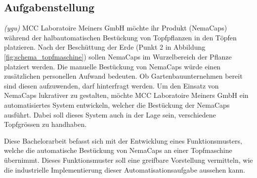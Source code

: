 \subsection{Aufgabenstellung}
\textit{(ygu)} MCC Laboratoire Meiners GmbH möchte ihr Produkt (NemaCaps) während der halbautomatischen Bestückung von Topfpflanzen in den Töpfen platzieren. Nach der Beschüttung der Erde (Punkt 2 in Abbildung \ref{fig:schema_topfmaschine}) sollen NemaCaps im Wurzelbereich der Pflanze platziert werden. Die manuelle Bestückung von NemaCaps würde einen zusätzlichen personellen Aufwand bedeuten. Ob Gartenbauunternehmen bereit sind diesen aufzuwenden, darf hinterfragt werden. Um den Einsatz von NemaCaps lukrativer zu gestalten, möchte MCC Laboratoire Meiners GmbH ein automatisiertes System entwickeln, welcher die Bestückung der NemaCaps ausführt. Dabei soll dieses System auch in der Lage sein, verschiedene Topfgrössen zu handhaben.
\newline

Diese Bachelorarbeit befasst sich mit der Entwicklung eines Funktionsmusters, welche die automatische Bestückung von NemaCaps an einer Topfmaschine übernimmt. Dieses Funktionsmuster soll eine greifbare Vorstellung vermitteln, wie die industrielle Implementierung dieser Automatisationsaufgabe aussehen kann. 
\newline 

